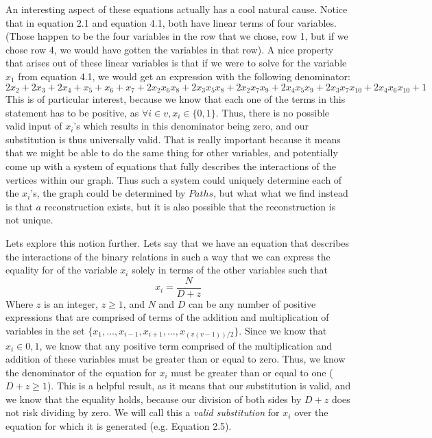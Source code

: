 \documentclass[11pt,a4paper]{report}
\begin{document}
An interesting aspect of these equations actually has a cool natural cause.  
Notice that in equation 2.1 and equation 4.1, both have linear terms of four variables.  
(Those happen to be the four variables in the row that we chose, row 1, but if we chose row 4, we would have gotten the variables in that row). 
A nice property that arises out of these linear variables is that if we were to solve for the variable $x_1$ from equation 4.1, we would get an expression with the following denominator: 
$$2x_2 + 2x_3 + 2x_4 + x_5 + x_6 + x_7 + 2x_2x_6x_8 + 2x_3x_5x_8 + 2x_2x_7x_9 + 2x_4x_5x_9 + 2x_3x_7x_{10} + 2x_4x_6x_{10} + 1$$
This is of particular interest, because we know that each one of the terms in this statement has to be positive, as $\forall i \in v,  x_i \in \{0, 1\}$.  
Thus, there is no possible valid input of $x_i$'s which results in this denominator being zero, and our substitution is thus universally valid.  
That is really important because it means that we might be able to do the same thing for other variables, and potentially come up with a system of equations that fully describes the interactions of the vertices within our graph. 
Thus such a system could uniquely determine each of the $x_i$'s, the graph could be determined by $Paths$, but what what we find instead is that $a$ reconstruction exists, but it is also possible that the reconstruction is not unique.

Lets explore this notion further.  
Lets say that we have an equation that describes the interactions of the binary relations in such a way that we can express the equality for of the variable 
$x_i$ solely in terms of the other variables such that $$x_i = \frac{N}{D + z}$$ Where $z$ is an integer, $z \geq 1$, and $N$ and $D$ 
can be any number of positive expressions that are comprised of terms of the addition and multiplication of variables in the set 
$\{x_1, \dots,  x_{i-1},x_{i+1}, \dots, x_{(v(v-1))/2}\}$.  Since we know that $x_i \in {0,1}$, we know that any positive term comprised of the multiplication and addition of these variables must be greater than or equal to zero.  
Thus, we know the denominator of the equation for $x_i$ must be greater than or equal to one ($D + z \geq 1$). 
This is a helpful result, as it means that our substitution is valid, and we know that the equality holds, because our division of both sides by $D + z$ 
does not risk dividing by zero.  We will call this a \emph{valid substitution} for $x_i$ over the equation for which it is generated (e.g. Equation 2.5). 
\end{document}
